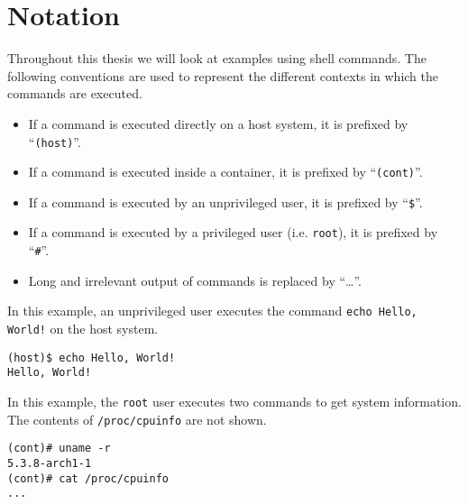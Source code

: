 \chapter{Notation}\label{chapter:notation}
Throughout this thesis we will look at examples using shell commands. The following conventions are used to represent the different contexts in which the commands are executed.

\begin{itemize}
    \item If a command is executed directly on a host system, it is prefixed by ``\lstinline{(host)}''.
    \item If a command is executed inside a container, it is prefixed by ``\lstinline{(cont)}''.
    \item If a command is executed by an unprivileged user, it is prefixed by ``\lstinline{$}''.
    \item If a command is executed by a privileged user (i.e. \lstinline{root}), it is prefixed by ``\lstinline{#}''.
    \item Long and irrelevant output of commands is replaced by ``\ldots''.
\end{itemize}

In this example, an unprivileged user executes the command \lstinline{echo Hello, World!} on the host system.
\begin{lstlisting}[caption={Shell command notation example 1}, captionpos=b]
(host)$ echo Hello, World!
Hello, World!
\end{lstlisting}

\hfill

In this example, the \lstinline{root} user executes two commands to get system information. The contents of \lstinline{/proc/cpuinfo} are not shown.
\begin{lstlisting}[caption={Shell command notation example 2}, captionpos=b]
(cont)# uname -r
5.3.8-arch1-1
(cont)# cat /proc/cpuinfo
...
\end{lstlisting}
